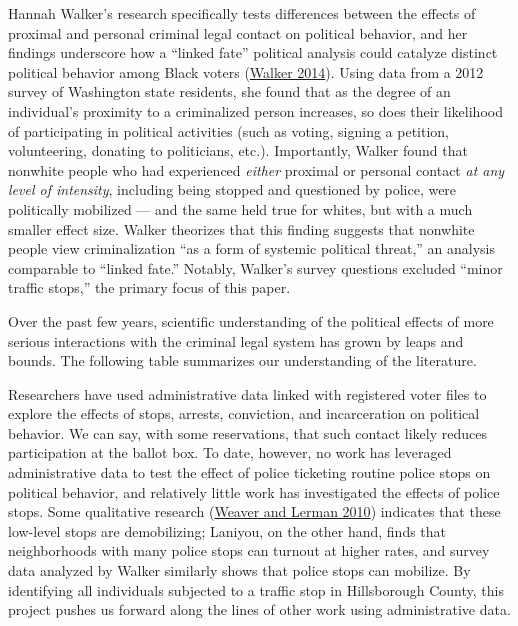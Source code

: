 \documentclass[
  12pt,
]{article}
\begin{document}
Hannah Walker's research specifically tests differences between the effects of proximal and personal criminal legal contact on political behavior, and her findings underscore how a ``linked fate'' political analysis could catalyze distinct political behavior among Black voters (\protect\hyperlink{ref-Walker2014}{Walker 2014}). Using data from a 2012 survey of Washington state residents, she found that as the degree of an individual's proximity to a criminalized person increases, so does their likelihood of participating in political activities (such as voting, signing a petition, volunteering, donating to politicians, etc.). Importantly, Walker found that nonwhite people who had experienced \emph{either} proximal or personal contact \emph{at any level of intensity}, including being stopped and questioned by police, were politically mobilized --- and the same held true for whites, but with a much smaller effect size. Walker theorizes that this finding suggests that nonwhite people view criminalization ``as a form of systemic political threat,'' an analysis comparable to ``linked fate.'' Notably, Walker's survey questions excluded ``minor traffic stops,'' the primary focus of this paper.

Over the past few years, scientific understanding of the political effects of more serious interactions with the criminal legal system has grown by leaps and bounds. The following table summarizes our understanding of the literature.

\begin{singlespace}

\end{singlespace}

Researchers have used administrative data linked with registered voter files to explore the effects of stops, arrests, conviction, and incarceration on political behavior. We can say, with some reservations, that such contact likely reduces participation at the ballot box. To date, however, no work has leveraged administrative data to test the effect of police ticketing routine police stops on political behavior, and relatively little work has investigated the effects of police stops. Some qualitative research (\protect\hyperlink{ref-Weaver2010}{Weaver and Lerman 2010}) indicates that these low-level stops are demobilizing; Laniyou, on the other hand, finds that neighborhoods with many police stops can turnout at higher rates, and survey data analyzed by Walker similarly shows that police stops can mobilize. By identifying all individuals subjected to a traffic stop in Hillsborough County, this project pushes us forward along the lines of other work using administrative data.
\end{document}
